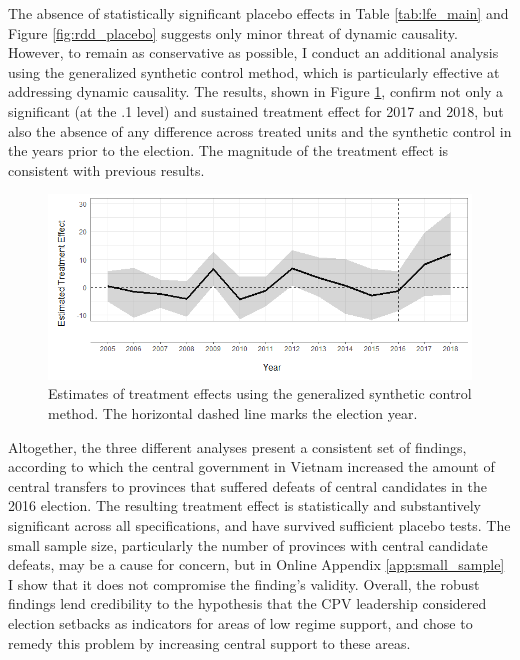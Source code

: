 \documentclass[12pt]{article}
\newcommand{\1}{\mathbbm{1}}
\begin{document}
The absence of statistically significant placebo effects in Table \ref{tab:lfe_main} and Figure \ref{fig:rdd_placebo} suggests only minor threat of dynamic causality. However, to remain as conservative as possible, I conduct an additional analysis using the generalized synthetic control method, which is particularly effective at addressing dynamic causality. The results, shown in Figure \ref{fig:synth_placebo}, confirm not only a significant (at the .1 level) and sustained treatment effect for 2017 and 2018, but also the absence of any difference across treated units and the synthetic control in the years prior to the election. The magnitude of the treatment effect is consistent with previous results.

\begin{figure}[!htbp]
	\centering
	\includegraphics[width=\textwidth]{figure/200422_synth_results.png}
	\captionsetup{singlelinecheck=off}
	\caption[Estimated synthetic control treatment effects]{Estimates of treatment effects using the generalized synthetic control method. The horizontal dashed line marks the election year.}
	\label{fig:synth_placebo}
\end{figure}

Altogether, the three different analyses present a consistent set of findings, according to which the central government in Vietnam increased the amount of central transfers to provinces that suffered defeats of central candidates in the 2016 election. The resulting treatment effect is statistically and substantively significant across all specifications, and have survived sufficient placebo tests. The small sample size, particularly the number of provinces with central candidate defeats, may be a cause for concern, but in Online Appendix \ref{app:small_sample} I show that it does not compromise the finding's validity. Overall, the robust findings lend credibility to the hypothesis that the CPV leadership considered election setbacks as indicators for areas of low regime support, and chose to remedy this problem by increasing central support to these areas.
\end{document}
